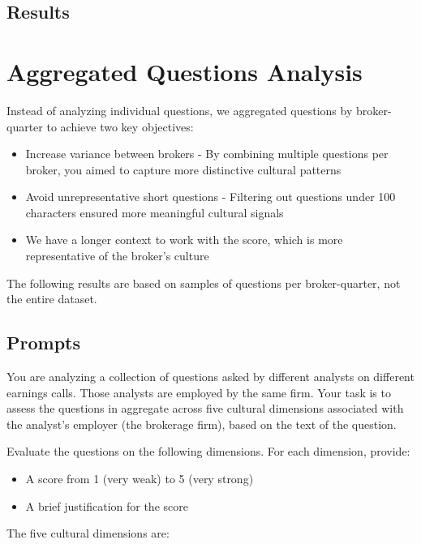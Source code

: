 \documentclass[10pt]{article}
\begin{document}
\subsection{Results}

    




\section{Aggregated Questions Analysis}
Instead of analyzing individual questions, we aggregated questions by broker-quarter to achieve two key objectives:
\begin{itemize}
\item Increase variance between brokers - By combining multiple questions per broker, you aimed to capture more distinctive cultural patterns
\item Avoid unrepresentative short questions - Filtering out questions under 100 characters ensured more meaningful cultural signals
\item We have a longer context to work with the score, which is more representative of the broker's culture
\end{itemize}

The following results are based on samples of questions per broker-quarter, not the entire dataset.

\subsection{Prompts}
You are analyzing a collection of questions asked by different analysts on different earnings calls. Those analysts are employed by the same firm. Your task is to assess the questions in aggregate across five cultural dimensions associated with the analyst’s employer (the brokerage firm), based on the text of the question.

Evaluate the questions on the following dimensions. For each dimension, provide:
\begin{itemize}
\item A score from 1 (very weak) to 5 (very strong)
\item A brief justification for the score
\end{itemize}

The five cultural dimensions are:
\end{document}
